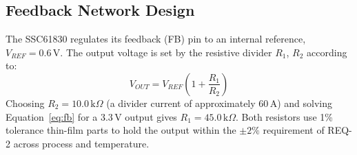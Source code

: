 \subsection{Feedback Network Design}
The SSC61830 regulates its feedback (FB) pin to an internal reference,
$V_{REF} = 0.6$\,V. The output voltage is set by the resistive divider $R_1$,
$R_2$ according to:
\begin{equation}
V_{OUT} = V_{REF}\left(1+\dfrac{R_1}{R_2}\right)
\label{eq:fb}
\end{equation}
Choosing $R_2 = 10.0\,\mathrm{k}\Omega$ (a divider current of approximately
60\,\textmu A) and solving Equation~\eqref{eq:fb} for a 3.3\,V output gives
$R_1 = 45.0\,\mathrm{k}\Omega$. Both resistors use 1\% tolerance thin-film
parts to hold the output within the $\pm2\%$ requirement of REQ-2 across
process and temperature.

